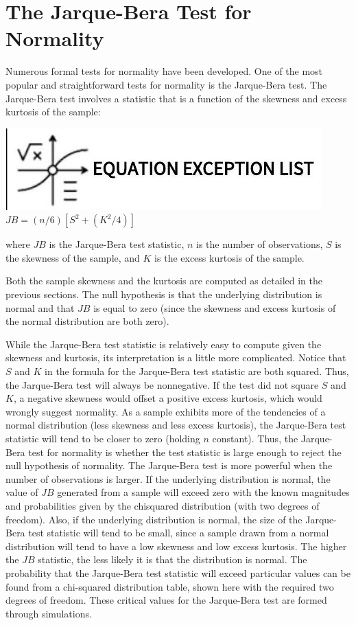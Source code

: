 \documentclass[11pt]{article}
\begin{document}
\section*{The Jarque-Bera Test for Normality}
Numerous formal tests for normality have been developed. One of the most popular and straightforward tests for normality is the Jarque-Bera test. The Jarque-Bera test involves a statistic that is a function of the skewness and excess kurtosis of the sample:

\includegraphics[max width=\textwidth, center]{2024_04_10_3ba0134d765492715516g-2}\\
$J B=(n / 6)\left[S^{2}+\left(K^{2} / 4\right)\right]$

where $J B$ is the Jarque-Bera test statistic, $n$ is the number of observations, $S$ is the skewness of the sample, and $K$ is the excess kurtosis of the sample.

Both the sample skewness and the kurtosis are computed as detailed in the previous sections. The null hypothesis is that the underlying distribution is normal and that $J B$ is equal to zero (since the skewness and excess kurtosis of the normal distribution are both zero).

While the Jarque-Bera test statistic is relatively easy to compute given the skewness and kurtosis, its interpretation is a little more complicated. Notice that $S$ and $K$ in the formula for the Jarque-Bera test statistic are both squared. Thus, the Jarque-Bera test will always be nonnegative. If the test did not square $S$ and $K$, a negative skewness would offset a positive excess kurtosis, which would wrongly suggest normality. As a sample exhibits more of the tendencies of a normal distribution (less skewness and less excess kurtosis), the Jarque-Bera test statistic will tend to be closer to zero (holding $n$ constant). Thus, the Jarque-Bera test for normality is whether the test statistic is large enough to reject the null hypothesis of normality. The Jarque-Bera test is more powerful when the number of observations is larger. If the underlying distribution is normal, the value of $J B$ generated from a sample will exceed zero with the known magnitudes and probabilities given by the chisquared distribution (with two degrees of freedom). Also, if the underlying distribution is normal, the size of the Jarque-Bera test statistic will tend to be small, since a sample drawn from a normal distribution will tend to have a low skewness and low excess kurtosis. The higher the $J B$ statistic, the less likely it is that the distribution is normal. The probability that the Jarque-Bera test statistic will exceed particular values can be found from a chi-squared distribution table, shown here with the required two degrees of freedom. These critical values for the Jarque-Bera test are formed through simulations.
\end{document}
